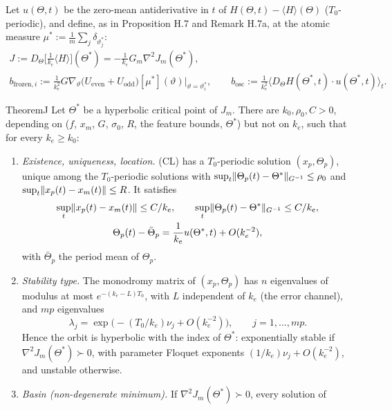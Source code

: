 Let $u(\Theta,t)$ be the zero-mean antiderivative in $t$ of $H(\Theta,t) - \langle H\rangle(\Theta)$
($T_0$-periodic), and define, as in Proposition H.7 and Remark H.7a, at the atomic measure
$\mu^* := \frac1m\sum_j\delta_{\vartheta^*_j}$:
\begin{gather*}
  J := D_\Theta\bigl[\tfrac1{k_e}\langle H\rangle\bigr](\Theta^*) = -\frac1{k_e}G_m\nabla^2J_m(\Theta^*),\\
  b_{\mathrm{frozen},i} := \frac1{k_e^2}G\nabla_\vartheta\bigl(U_{\mathrm{even}} + U_{\mathrm{odd}}\bigr)[\mu^*](\vartheta)
  \Big|_{\vartheta=\vartheta^*_i},\qquad
  b_{\mathrm{osc}} := \frac1{k_e^2}\bigl\langle D_\Theta H(\Theta^*,t)\cdot u(\Theta^*,t)\bigr\rangle_t.
\end{gather*}

\begin{thm}{Theorem}{J}
Let $\Theta^*$ be a hyperbolic critical point of $J_m$. There are $k_0,\rho_0,C>0$, depending on \textup{(}$f$, $x_m$,
$G$, $\sigma_0$, $R$, the feature bounds, $\Theta^*$\textup{)} but not on $k_e$, such that for every $k_e\ge k_0$:
\begin{enumerate}[label=\textup{(\alph*)}]
  \item \emph{Existence, uniqueness, location.} \textup{(CL)} has a $T_0$-periodic solution $(x_p,\Theta_p)$, unique
    among the $T_0$-periodic solutions with $\sup_t\lVert \Theta_p(t) - \Theta^*\rVert_{G^{-1}} \le \rho_0$ and
    $\sup_t\lVert x_p(t) - x_m(t)\rVert \le R$. It satisfies
    \begin{gather*}
      \sup_t\lVert x_p(t) - x_m(t)\rVert \le C/k_e,\qquad \sup_t\lVert \Theta_p(t) - \Theta^*\rVert_{G^{-1}} \le C/k_e,\\
      \Theta_p(t) - \bar\Theta_p = \frac1{k_e}u(\Theta^*,t) + O(k_e^{-2}),
    \end{gather*}
    with $\bar\Theta_p$ the period mean of $\Theta_p$.
  \item \emph{Stability type.} The monodromy matrix of $(x_p,\Theta_p)$ has $n$ eigenvalues of modulus at most
    $e^{-(k_e - L)T_0}$, with $L$ independent of $k_e$ \textup{(}the error channel\textup{)}, and $mp$ eigenvalues
    \[
      \lambda_j = \exp\bigl(-(T_0/k_e)\nu_j + O(k_e^{-2})\bigr),\qquad j = 1,\dots,mp.
    \]
    Hence the orbit is hyperbolic with the index of $\Theta^*$: exponentially stable if $\nabla^2J_m(\Theta^*)\succ0$,
    with parameter Floquet exponents $(1/k_e)\nu_j + O(k_e^{-2})$, and unstable otherwise.
  \item \emph{Basin \textup{(}non-degenerate minimum\textup{)}.} If $\nabla^2J_m(\Theta^*)\succ0$, every solution of

\end{enumerate}
\end{thm}
